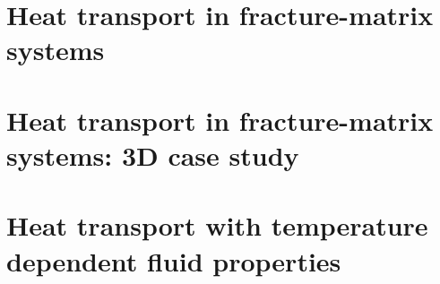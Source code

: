 \section{Heat transport in fracture-matrix systems}




\section{Heat transport in fracture-matrix systems: 3D case study}



\section{Heat transport with temperature dependent fluid properties}

 
